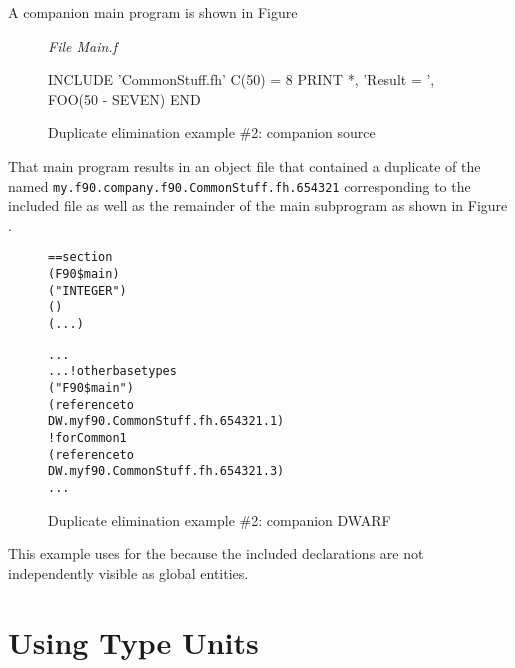 A companion main program is shown in 
Figure 

\begin{figure}
\textit{File Main.f} 
\begin{nlnlisting}
INCLUDE 'CommonStuff.fh'
C(50) = 8
PRINT *, 'Result = ', FOO(50 - SEVEN)
END
\end{nlnlisting}
\caption{Duplicate elimination example \#2: companion source }
\label{fig:duplicateeliminationexample2companionsource}
\end{figure}

That main program results in an object file that
contained a duplicate of the  named
\texttt{my.f90.company.f90.CommonStuff.fh.654321} 
corresponding to the
included file as well as the remainder of the main subprogram
as shown in 
Figure .

\begin{figure}
\begin{dwflisting}
\begin{alltt}
== section \dotdebuginfo{}
    \DWTAGcompileunit
        \DWATname(F90\$main)
        \DWTAGbasetype
            \DWATname("INTEGER")
            \DWATencoding(\DWATEsigned)
            \DWATbytesize(...)

        \DWTAGbasetype
            ...
        ...  ! other base types
        \DWTAGsubprogram
            \DWATname("F90\$main")
            \DWTAGimportedunit
                \DWATimport(reference to
                    DW.myf90.CommonStuff.fh.654321.1)
            \DWTAGcommoninclusion ! for Common1
                \DWATcommonreference(reference to
                    DW.myf90.CommonStuff.fh.654321.3)
            ...
\end{alltt}
\end{dwflisting}
\caption{Duplicate elimination example \#2: companion DWARF }
\label{fig:duplicateeliminationexample2companiondwarf}
\end{figure}

This example uses \DWTAGpartialunit{} for the 
because the included declarations are not independently
visible as global entities.


\section{Using Type Units}
\label{app:usingtypeunits}

